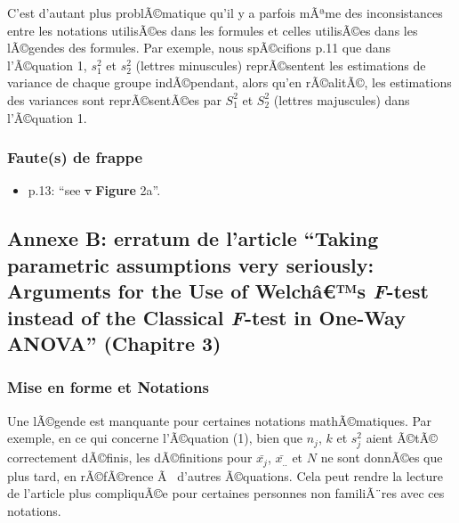 \begin{appendix}
C'est d'autant plus problÃ©matique qu'il y a parfois mÃªme des
inconsistances entre les notations utilisÃ©es dans les formules et
celles utilisÃ©es dans les lÃ©gendes des formules. Par exemple, nous
spÃ©cifions p.11 que dans l'Ã©quation 1, \(s^2_1\) et \(s^2_2\) (lettres
minuscules) reprÃ©sentent les estimations de variance de chaque groupe
indÃ©pendant, alors qu'en rÃ©alitÃ©, les estimations des variances sont
reprÃ©sentÃ©es par \(S^2_1\) et \(S^2_2\) (lettres majuscules) dans
l'Ã©quation 1.

\hypertarget{fautes-de-frappe}{%
\subsubsection{Faute(s) de frappe}\label{fautes-de-frappe}}

\begin{itemize}
\tightlist
\item
  p.13: ``see \sout{v} \textbf{Figure} 2a''.
\end{itemize}

\newpage

\hypertarget{annexe-b-erratum-de-larticle-taking-parametric-assumptions-very-seriously-arguments-for-the-use-of-welchuxe2s-f-test-instead-of-the-classical-f-test-in-one-way-anova-chapitre-3}{%
\subsection{\texorpdfstring{Annexe B: erratum de l'article ``Taking
parametric assumptions very seriously: Arguments for the Use of
Welchâ€™s \emph{F}-test instead of the Classical \emph{F}-test in
One-Way ANOVA'' (Chapitre
3)}{Annexe B: erratum de l'article ``Taking parametric assumptions very seriously: Arguments for the Use of Welchâ€™s F-test instead of the Classical F-test in One-Way ANOVA'' (Chapitre 3)}}\label{annexe-b-erratum-de-larticle-taking-parametric-assumptions-very-seriously-arguments-for-the-use-of-welchuxe2s-f-test-instead-of-the-classical-f-test-in-one-way-anova-chapitre-3}}

\hypertarget{mise-en-forme-et-notations-1}{%
\subsubsection{Mise en forme et
Notations}\label{mise-en-forme-et-notations-1}}

Une lÃ©gende est manquante pour certaines notations mathÃ©matiques. Par
exemple, en ce qui concerne l'Ã©quation (1), bien que \(n_j\), \(k\) et
\(s^2_j\) aient Ã©tÃ© correctement dÃ©finis, les dÃ©finitions pour
\(\bar{x_j}\), \(\bar{x_{..}}\) et \(N\) ne sont donnÃ©es que plus tard,
en rÃ©fÃ©rence Ã~ d'autres Ã©quations. Cela peut rendre la lecture de
l'article plus compliquÃ©e pour certaines personnes non familiÃ¨res avec
ces notations.


\end{appendix}
